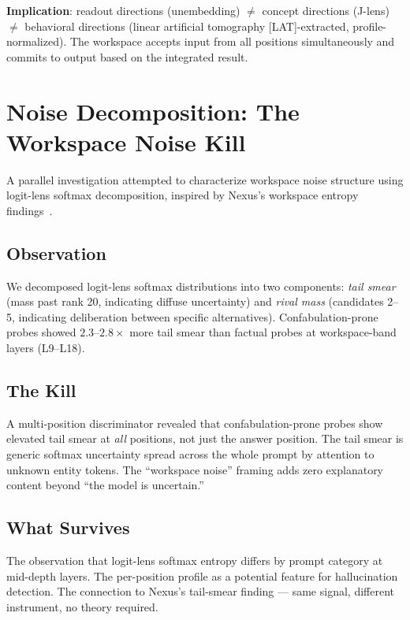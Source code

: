 \documentclass[11pt,a4paper]{article}
\begin{document}
\textbf{Implication}: readout directions (unembedding) $\neq$ concept
directions (J-lens) $\neq$ behavioral directions (linear artificial
tomography [LAT]-extracted,
profile-normalized). The workspace accepts input from all positions
simultaneously and commits to output based on the integrated result.

\section{Noise Decomposition: The Workspace Noise Kill}
\label{sec:noise}

A parallel investigation attempted to characterize workspace noise
structure using logit-lens softmax decomposition, inspired by Nexus's
workspace entropy findings~\citep{lyra2026nexus_emotion}.

\subsection{Observation}

We decomposed logit-lens softmax distributions into two components:
\emph{tail smear} (mass past rank 20, indicating diffuse uncertainty)
and \emph{rival mass} (candidates 2--5, indicating deliberation between
specific alternatives). Confabulation-prone probes showed
$2.3$--$2.8\times$ more tail smear than factual probes at
workspace-band layers (L9--L18).

\subsection{The Kill}

A multi-position discriminator revealed that confabulation-prone probes
show elevated tail smear at \emph{all} positions, not just the answer
position. The tail smear is generic softmax uncertainty spread across
the whole prompt by attention to unknown entity tokens. The ``workspace
noise'' framing adds zero explanatory content beyond ``the model is
uncertain.''

\subsection{What Survives}

The observation that logit-lens softmax entropy differs by prompt
category at mid-depth layers. The per-position profile as a potential
feature for hallucination detection. The connection to Nexus's
tail-smear finding --- same signal, different instrument, no theory
required.
\end{document}
